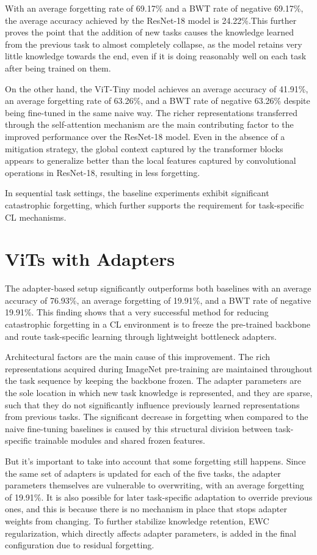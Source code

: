 \documentclass[english, LaM, oneside]{sapthesis}%
\numberwithin{equation}{chapter}
\begin{document}
With an average forgetting rate of 69.17\% and a BWT rate of negative 69.17\%, the average accuracy achieved by the ResNet-18 model is 24.22\%.This further proves the point that the addition of new tasks causes the knowledge learned from the previous task to almost completely collapse, as the model retains very little knowledge towards the end, even if it is doing reasonably well on each task after being trained on them.

On the other hand, the ViT-Tiny model achieves an average accuracy of 41.91\%, an average forgetting rate of 63.26\%, and a BWT rate of negative 63.26\% despite being fine-tuned in the same naive way. The richer representations transferred through the self-attention mechanism are the main contributing factor to the improved performance over the ResNet-18 model. Even in the absence of a mitigation strategy, the global context captured by the transformer blocks appears to generalize better than the local features captured by convolutional operations in ResNet-18, resulting in less forgetting.

In sequential task settings, the baseline experiments exhibit significant catastrophic forgetting, which further supports the requirement for task-specific CL mechanisms. 
\section{ViTs with Adapters}
\label{sec:5.2}
The adapter-based setup significantly outperforms both baselines with an average accuracy of 76.93\%, an average forgetting of 19.91\%, and a BWT rate of negative 19.91\%. This finding shows that a very successful method for reducing catastrophic forgetting in a CL environment is to freeze the pre-trained backbone and route task-specific learning through lightweight bottleneck adapters.

Architectural factors are the main cause of this improvement. The rich representations acquired during ImageNet pre-training are maintained throughout the task sequence by keeping the backbone frozen. The adapter parameters are the sole location in which new task knowledge is represented, and they are sparse, such that they do not significantly influence previously learned representations from previous tasks. The significant decrease in forgetting when compared to the naive fine-tuning baselines is caused by this structural division between task-specific trainable modules and shared frozen features.

But it's important to take into account that some forgetting still happens. Since the same set of adapters is updated for each of the five tasks, the adapter parameters themselves are vulnerable to overwriting, with an average forgetting of 19.91\%. It is also possible for later task-specific adaptation to override previous ones, and this is because there is no mechanism in place that stops adapter weights from changing. To further stabilize knowledge retention, EWC regularization, which directly affects adapter parameters, is added in the final configuration due to residual forgetting.
\end{document}
